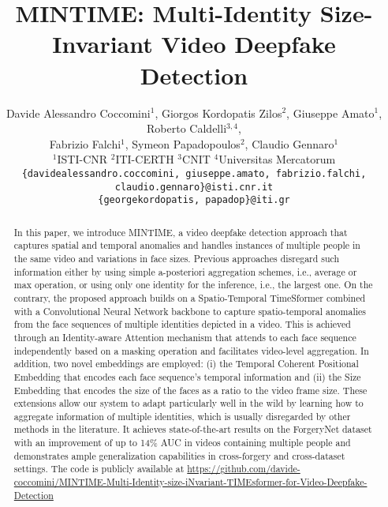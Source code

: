\documentclass[10pt,twocolumn,letterpaper]{article}
\begin{document}
\title{MINTIME: Multi-Identity Size-Invariant Video Deepfake Detection}





\author{Davide Alessandro Coccomini$^1$, Giorgos Kordopatis Zilos$^2$, Giuseppe Amato$^1$, Roberto Caldelli$^{3,4}$, \\ Fabrizio Falchi$^1$, Symeon Papadopoulos$^2$, Claudio Gennaro$^1$ \\
$^1$ISTI-CNR \quad $^2$ITI-CERTH \quad $^3$CNIT \quad $^4$Universitas Mercatorum \\
{\tt\small \{davidealessandro.coccomini, giuseppe.amato, fabrizio.falchi, claudio.gennaro\}@isti.cnr.it} \\
{\tt\small \{georgekordopatis, papadop\}@iti.gr} }
\maketitle
\begin{abstract}
In this paper, we introduce MINTIME, a video deepfake detection approach that captures spatial and temporal anomalies and handles instances of multiple people in the same video and variations in face sizes. Previous approaches disregard such information either by using simple a-posteriori aggregation schemes, i.e., average or max operation, or using only one identity for the inference, i.e., the largest one. On the contrary, the proposed approach builds on a Spatio-Temporal TimeSformer combined with a Convolutional Neural Network backbone to capture spatio-temporal anomalies from the face sequences of multiple identities depicted in a video. This is achieved through an Identity-aware Attention mechanism that attends to each face sequence independently based on a masking operation and facilitates video-level aggregation. In addition, two novel embeddings are employed: (i) the Temporal Coherent Positional Embedding that encodes each face sequence's temporal information and (ii) the Size Embedding that encodes the size of the faces as a ratio to the video frame size. These extensions allow our system to adapt particularly well in the wild by learning how to aggregate information of multiple identities, which is usually disregarded by other methods in the literature. It achieves state-of-the-art results on the ForgeryNet dataset with an improvement of up to 14\% AUC in videos containing multiple people and demonstrates ample generalization capabilities in cross-forgery and cross-dataset settings. The code is publicly available at \url{https://github.com/davide-coccomini/MINTIME-Multi-Identity-size-iNvariant-TIMEsformer-for-Video-Deepfake-Detection}
\end{abstract}
\end{document}
